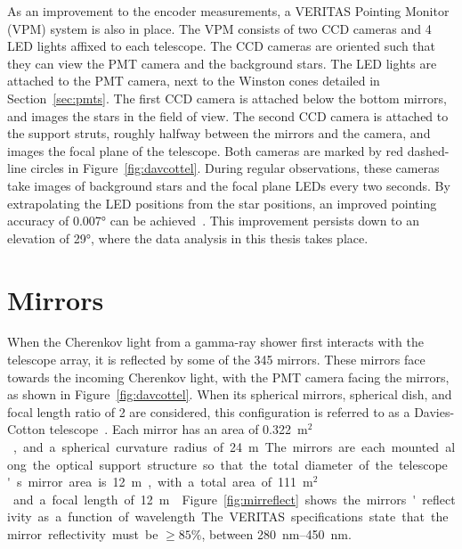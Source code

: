 As an improvement to the encoder measurements, a VERITAS Pointing Monitor (VPM) system is also in place.
The VPM consists of two CCD cameras and 4 LED lights affixed to each telescope.
The CCD cameras are oriented such that they can view the PMT camera and the background stars.
The LED lights are attached to the PMT camera, next to the Winston cones detailed in Section~\ref{sec:pmts}.
The first CCD camera is attached below the bottom mirrors, and images the stars in the field of view.
The second CCD camera is attached to the support struts, roughly halfway between the mirrors and the camera, and images the focal plane of the telescope.
Both cameras are marked by red dashed-line circles in Figure~\ref{fig:davcottel}.
During regular observations, these cameras take images of background stars and the focal plane LEDs every two seconds.
By extrapolating the LED positions from the star positions, an improved pointing accuracy of \nicetilde{}\ang{0.007} can be achieved~\cite{VPMmemo}.
%
This improvement persists down to an elevation of \ang{29}, where the data analysis in this thesis takes place.

\section{Mirrors}\label{sec:mirrors}

When the Cherenkov light from a gamma-ray shower first interacts with the telescope array, it is reflected by some of the 345 mirrors.
These mirrors face towards the incoming Cherenkov light, with the PMT camera facing the mirrors, as shown in Figure~\ref{fig:davcottel}.
When its spherical mirrors, spherical dish, and focal length ratio of \nicetilde{}2 are considered, this configuration is referred to as a Davies-Cotton telescope~\cite{daviescotton}.
Each mirror has an area of \SI{0.322}{m$^2$}, and a spherical curvature radius of \SI{24}{m}.
The mirrors are each mounted along the optical support structure so that the total diameter of the telescope's mirror area is \SI{12}{m}, with a total area of \SI{111}{m$^2$} and a focal length of \SI{12}{m}~\cite{Veritas_Detector}.
Figure~\ref{fig:mirreflect} shows the mirrors' reflectivity as a function of wavelength.
The VERITAS specifications state that the mirror reflectivity must be $\geq 85\%$, between \SIrange{280}{450}{nm}.

